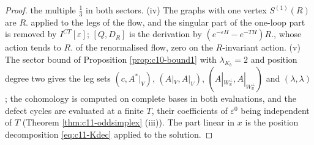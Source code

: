 \begin{proof}
the multiple $\tfrac13$ in both sectors. (iv) The graphs with one vertex $S^{(1)}(R)$ are $R.$ applied to the legs of the flow, and the singular part of the one-loop part is removed by $I^{CT}[\varepsilon]$; $[Q,D_R]$ is the derivation by $(e^{-\varepsilon H}-e^{-TH})R.$, whose action tends to $R.$ of the renormalised flow, zero on the $R$-invariant action. (v) The sector bound of Proposition \ref{prop:c10-bound1} with $\lambda_{K_b}=2$ and position degree two gives the leg sets $(c,A^*|_V)$, $(A|_V,A|_V)$, $(A|_{W_{\mathbb R}^\perp},A|_{W_{\mathbb R}^\perp})$ and $(\lambda,\lambda)$; the cohomology is computed on complete bases in both evaluations, and the defect cycles are evaluated at a finite $T$, their coefficients of $\varepsilon^0$ being independent of $T$ (Theorem \ref{thm:c11-oddsimplex} (iii)). The part linear in $x$ is the position decomposition \eqref{eq:c11-Kdec} applied to the solution.
\end{proof}

